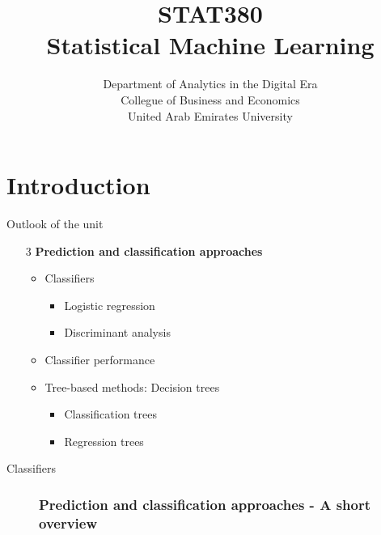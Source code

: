 \documentclass{beamer}
\title[Statistical Machine Learning]{STAT380 \\Statistical Machine Learning}
\author[STAT380]{Department of Analytics in the Digital Era\\Collegue of Business and Economics\\United Arab Emirates University}
\institute[]{}
\date[UAEU]{}
\begin{document}
%

\section{Introduction}



\begin{frame}{Outlook of the unit}
	
	\begin{itemize}
		\item[3] \textbf{Prediction and classification approaches}
		\vspace{0.2cm}
	\begin{itemize}

		\item Classifiers
			\begin{itemize}
			\item Logistic regression
				\vspace{0.2cm}
			\item Discriminant analysis
					\end{itemize}
			\vspace{0.2cm}
			\item Classifier performance
				\vspace{0.2cm}
			\item Tree-based methods: Decision trees
				\vspace{0.2cm}
				\begin{itemize}
				\item Classification trees
				\vspace{0.2cm}
				\item
				Regression trees
	\end{itemize}
		\end{itemize}
		\end{itemize}		
\end{frame}


\begin{frame}
	\begin{center}
		\Large{\textcolor{dkblue}{Classifiers}}
	\end{center}
\end{frame}

\begin{frame}
	\begin{figure}	
		\frametitle{Prediction and classification approaches - A short overview}
		\centering
		\hspace*{-0.8cm}
	\end{figure}
\end{frame}
\end{document}
